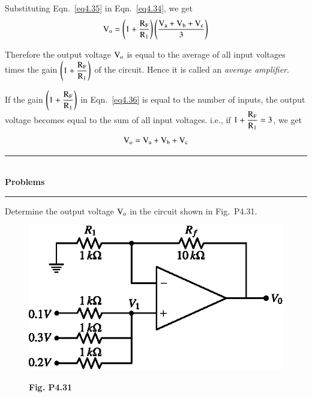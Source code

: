 Substituting Eqn.~\eqref{eq4.35} in Eqn.~\eqref{eq4.34}, we get
\begin{equation}
\textrm{V}_{\textrm{o}}=\left(1+\frac{\textrm{R}_{\textrm{F}}}{\textrm{R}_{1}}\right)\left(\frac{\textrm{V}_{\textrm{a}}+\textrm{V}_{\textrm{b}}+\textrm{V}_{\textrm{c}}}{3}\right)\label{eq4.36}
\end{equation}

Therefore the output voltage $\textrm{V}_{\textrm{o}}$ is equal to the average of all input voltages times the gain $\left(1+\dfrac{\textrm{R}_{\textrm{F}}}{\textrm{R}_{1}}\right)$ of the circuit. Hence it is called an {\em average amplifier}.

If the gain $\left(1+\dfrac{\textrm{R}_{\textrm{F}}}{\textrm{R}_{1}}\right)$ in Eqn.~\eqref{eq4.36} is equal to the number of inputs, the output voltage becomes equal to the sum of all input voltages. i.e., if $1+\dfrac{\textrm{R}_{\textrm{F}}}{\textrm{R}_{1}}=3$, we get
\begin{equation}
\textrm{V}_{\textrm{o}}=\textrm{V}_{\textrm{a}}+\textrm{V}_{\textrm{b}}+\textrm{V}_{\textrm{c}}\label{eq4.37}
\end{equation}

\eject

\begin{center}
\rule{4cm}{1pt}\\
{\bf\Large Problems}\\[-3pt]
\rule{4cm}{1pt}
\end{center}

\begin{problem}\label{prob4.31}
Determine the output voltage $\textrm{V}_{\textrm{o}}$ in the circuit shown in Fig.~P4.31.
\begin{figure}[H]
\centering
\includegraphics{chap4/figP4.30.eps}

\smallskip
{\bf Fig. P4.31}
\end{figure}
\end{problem}

